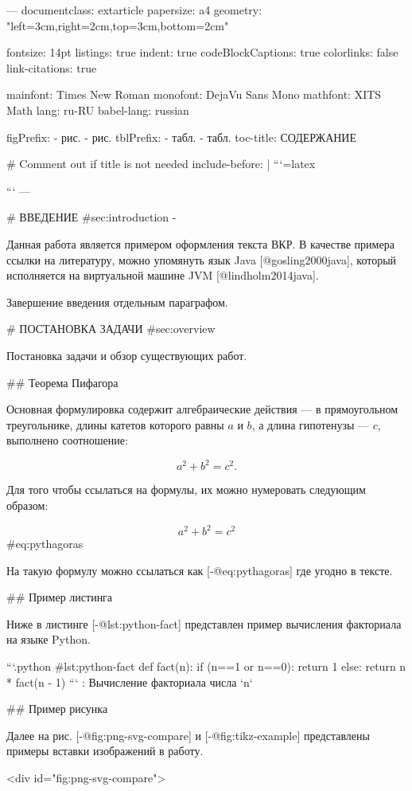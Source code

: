 ---
documentclass: extarticle
papersize: a4
geometry: "left=3cm,right=2cm,top=3cm,bottom=2cm"

fontsize: 14pt
listings: true
indent: true
codeBlockCaptions: true
colorlinks: false
link-citations: true

mainfont: Times New Roman
monofont: DejaVu Sans Mono
mathfont: XITS Math
lang: ru-RU
babel-lang: russian

figPrefix: 
  - рис.
  - рис.
tblPrefix: 
  - табл.
  - табл.
toc-title: СОДЕРЖАНИЕ

# Comment out if title is not needed
include-before: |
  ```{=latex}
  
  ```
---

\pagebreak
# ВВЕДЕНИЕ {#sec:introduction -}

Данная работа является примером оформления текста ВКР.
В качестве примера ссылки на литературу, можно упомянуть язык Java [@gosling2000java],
который исполняется на виртуальной машине JVM [@lindholm2014java].

Завершение введения отдельным параграфом.

\clearpage
\pagebreak
# ПОСТАНОВКА ЗАДАЧИ {#sec:overview}

Постановка задачи и обзор существующих работ.

## Теорема Пифагора

Основная формулировка содержит алгебраические действия ---
в прямоугольном треугольнике, длины катетов которого равны 
$a$ и $b$, а длина гипотенузы --- $c$, выполнено соотношение:

$$
a^2 + b^2 = c^2.
$$

Для того чтобы ссылаться на формулы, их можно нумеровать следующим образом:

$$
a^2 + b^2 = c^2
$$ {#eq:pythagoras}

На такую формулу можно ссылаться как [-@eq:pythagoras] где угодно в тексте.

## Пример листинга

Ниже в листинге [-@lst:python-fact] представлен пример
вычисления факториала на языке Python.

```{.python #lst:python-fact}
def fact(n):
  if (n==1 or n==0):
    return 1
  else:
    return n * fact(n - 1)
```
: Вычисление факториала числа `n`

## Пример рисунка

Далее на рис. [-@fig:png-svg-compare] и [-@fig:tikz-example] представлены
примеры вставки изображений в работу.

<div id="fig:png-svg-compare">

